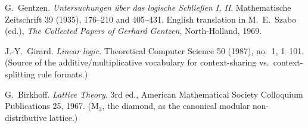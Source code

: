 
G.~Gentzen.
\emph{Untersuchungen \"uber das logische Schlie{\ss}en I, II}.
Mathematische Zeitschrift 39 (1935), 176--210 and 405--431. English
translation in M.~E.~Szabo (ed.), \emph{The Collected Papers of Gerhard
Gentzen}, North-Holland, 1969.

J.-Y.~Girard.
\emph{Linear logic}.
Theoretical Computer Science 50 (1987), no.~1, 1--101. (Source of the
additive/multiplicative vocabulary for context-sharing vs.\
context-splitting rule formats.)

G.~Birkhoff.
\emph{Lattice Theory}.
3rd ed., American Mathematical Society Colloquium Publications 25, 1967.
(M$_3$, the diamond, as the canonical modular non-distributive lattice.)

